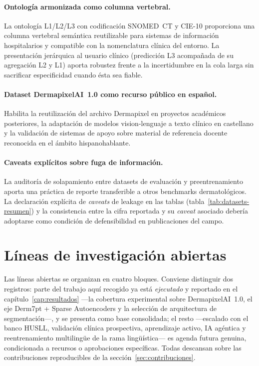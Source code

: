\paragraph{Ontología armonizada como columna vertebral.}
La ontología L1/L2/L3 con codificación SNOMED~CT y CIE-10
proporciona una columna vertebral semántica reutilizable para
sistemas de información hospitalarios y compatible con la
nomenclatura clínica del entorno. La presentación jerárquica al
usuario clínico (predicción L3 acompañada de su agregación L2 y
L1) aporta robustez frente a la incertidumbre en la cola larga sin
sacrificar especificidad cuando ésta sea fiable.

\paragraph{Dataset DermapixelAI~1.0 como recurso público en español.}
Habilita la reutilización del archivo Dermapixel en proyectos
académicos posteriores, la adaptación de modelos vision-lenguaje a
texto clínico en castellano y la validación de sistemas de apoyo
sobre material de referencia docente reconocida en el ámbito
hispanohablante.

\paragraph{Caveats explícitos sobre fuga de información.}
La auditoría de solapamiento entre datasets de evaluación y
preentrenamiento aporta una práctica de reporte transferible a
otros benchmarks dermatológicos. La declaración explícita de
\emph{caveats} de leakage en las tablas
(tabla~\ref{tab:datasets-resumen}) y la consistencia entre la cifra
reportada y su \emph{caveat} asociado debería adoptarse como
condición de defensibilidad en publicaciones del campo.

\section{Líneas de investigación abiertas}
\label{sec:lineas-abiertas}

Las líneas abiertas se organizan en cuatro bloques. Conviene distinguir
dos registros: parte del trabajo aquí recogido ya está \emph{ejecutado}
y reportado en el capítulo~\ref{cap:resultados} ---la cobertura
experimental sobre DermapixelAI~1.0, el eje Derm7pt + Sparse Autoencoders
y la selección de arquitectura de segmentación---, y se presenta como
base consolidada; el resto ---escalado con el banco HUSLL, validación
clínica prospectiva, aprendizaje activo, IA agéntica y reentrenamiento
multilingüe de la rama lingüística--- es agenda futura genuina,
condicionada a recursos o aprobaciones específicas. Todas descansan sobre
las contribuciones reproducibles de la sección~\ref{sec:contribuciones}.

